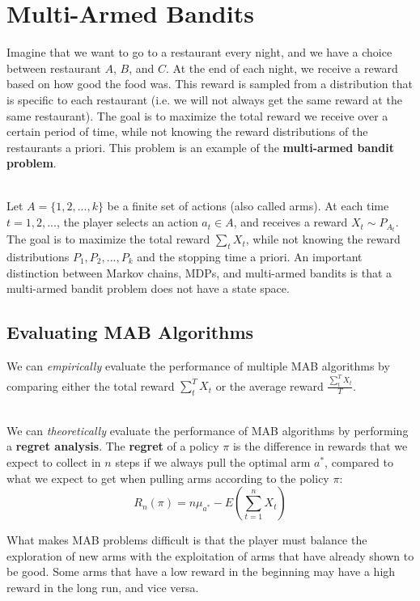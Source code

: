 \documentclass[12pt]{article}
\begin{document}
%
%
\newpage
\section{Multi-Armed Bandits}
Imagine that we want to go to a restaurant every night, and we have a choice between restaurant $A$, $B$, and $C$.
At the end of each night, we receive a reward based on how good the food was.
This reward is sampled from a distribution that is specific to each restaurant (i.e. we will not always get the same reward at the same restaurant).
The goal is to maximize the total reward we receive over a certain period of time, while not knowing the reward distributions of the restaurants a priori.
This problem is an example of the \textbf{multi-armed bandit problem}.

\noindent
\\
Let $A = \{ 1, 2, ... , k \}$ be a finite set of actions (also called arms).
At each time $t = 1, 2, ...$, the player selects an action $a_t \in A$, and receives a reward $X_t \sim P_{A_t}$.
The goal is to maximize the total reward $\sum_t X_t$, while not knowing the reward distributions $P_1, P_2, ... , P_k$ and the stopping time a priori.
An important distinction between Markov chains, MDPs, and multi-armed bandits is that a multi-armed bandit problem does not have a state space.

\subsection{Evaluating MAB Algorithms}
We can \textit{empirically} evaluate the performance of multiple MAB algorithms by comparing either the total reward $\sum_t^T X_t$ or the average reward $\displaystyle \frac{\sum_t^T X_t}{T}$.

\noindent
\\
We can \textit{theoretically} evaluate the performance of MAB algorithms by performing a \textbf{regret analysis}.
The \textbf{regret} of a policy $\pi$ is the difference in rewards that we expect to collect in $n$ steps if we always pull the optimal arm $a^*$, compared to what we expect to get when pulling arms according to the policy $\pi$:
\[ R_n(\pi) = n\mu_{a^*} - E\left( \sum_{t = 1}^n X_t \right) \]

\noindent
What makes MAB problems difficult is that the player must balance the exploration of new arms with the exploitation of arms that have already shown to be good.
Some arms that have a low reward in the beginning may have a high reward in the long run, and vice versa.
\end{document}
